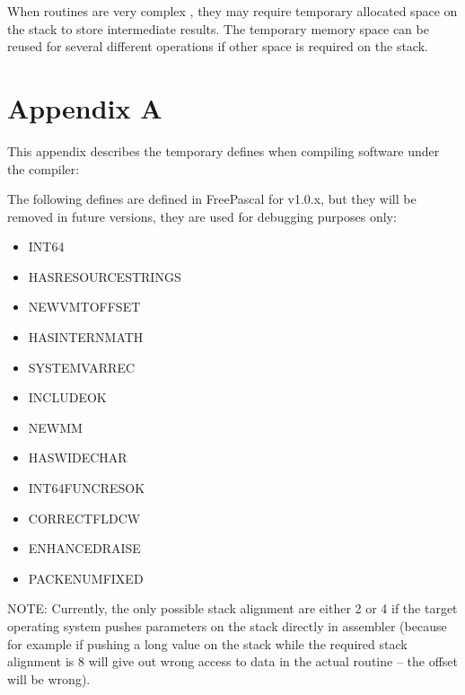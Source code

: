 \documentclass [a4paper,12pt]{article}
\begin{document}
When routines are very complex , they may require temporary allocated space
on the stack to store intermediate results. The temporary memory space can
be reused for several different operations if other space is required on the
stack.

\section{Appendix A}
\label{sec:appendix}

This appendix describes the temporary defines when compiling software under
the compiler:

The following defines are defined in FreePascal for v1.0.x, but they will be
removed in future versions, they are used for debugging purposes only:

\begin{itemize}
\item INT64
\item HASRESOURCESTRINGS
\item NEWVMTOFFSET
\item HASINTERNMATH
\item SYSTEMVARREC
\item INCLUDEOK
\item NEWMM
\item HASWIDECHAR
\item INT64FUNCRESOK
\item CORRECTFLDCW
\item ENHANCEDRAISE
\item PACKENUMFIXED
\end{itemize}

NOTE: Currently, the only possible stack alignment are either 2 or 4 if the
target operating system pushes parameters on the stack directly in assembler
(because for example if pushing a long value on the stack while the required
stack alignment is 8 will give out wrong access to data in the actual
routine -- the offset will be wrong).

\printindex
\end{document}
